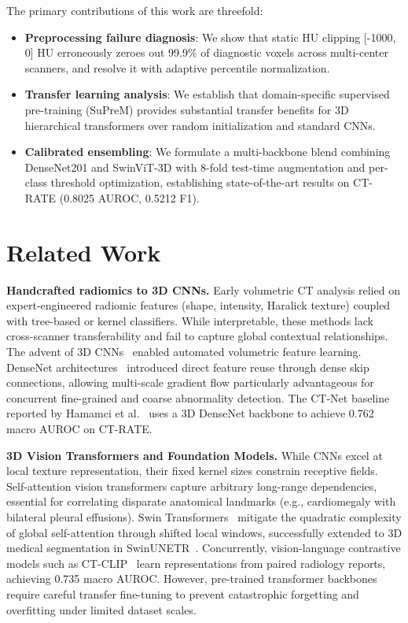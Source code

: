 \documentclass[runningheads]{llncs}
\begin{document}
The primary contributions of this work are threefold:
\begin{itemize}
\setlength{\itemsep}{1pt}\setlength{\parskip}{0pt}
\item \textbf{Preprocessing failure diagnosis}: We show that static HU clipping [-1000, 0] HU erroneously zeroes out 99.9\% of diagnostic voxels across multi-center scanners, and resolve it with adaptive percentile normalization.
\item \textbf{Transfer learning analysis}: We establish that domain-specific supervised pre-training (SuPreM) provides substantial transfer benefits for 3D hierarchical transformers over random initialization and standard CNNs.
\item \textbf{Calibrated ensembling}: We formulate a multi-backbone blend combining DenseNet201 and SwinViT-3D with 8-fold test-time augmentation and per-class threshold optimization, establishing state-of-the-art results on CT-RATE (0.8025 AUROC, 0.5212 F1).
\end{itemize}

\section{Related Work}
\noindent\textbf{Handcrafted radiomics to 3D CNNs.} Early volumetric CT analysis relied on expert-engineered radiomic features (shape, intensity, Haralick texture) coupled with tree-based or kernel classifiers. While interpretable, these methods lack cross-scanner transferability and fail to capture global contextual relationships. The advent of 3D CNNs~\cite{hara2018,monai2020} enabled automated volumetric feature learning. DenseNet architectures~\cite{huang2017} introduced direct feature reuse through dense skip connections, allowing multi-scale gradient flow particularly advantageous for concurrent fine-grained and coarse abnormality detection. The CT-Net baseline reported by Hamamci et al.~\cite{ctrate2024} uses a 3D DenseNet backbone to achieve 0.762 macro AUROC on CT-RATE.

\noindent\textbf{3D Vision Transformers and Foundation Models.} While CNNs excel at local texture representation, their fixed kernel sizes constrain receptive fields. Self-attention vision transformers capture arbitrary long-range dependencies, essential for correlating disparate anatomical landmarks (e.g., cardiomegaly with bilateral pleural effusions). Swin Transformers~\cite{liu2021} mitigate the quadratic complexity of global self-attention through shifted local windows, successfully extended to 3D medical segmentation in SwinUNETR~\cite{tang2022}. Concurrently, vision-language contrastive models such as CT-CLIP~\cite{ctrate2024} learn representations from paired radiology reports, achieving 0.735 macro AUROC. However, pre-trained transformer backbones require careful transfer fine-tuning to prevent catastrophic forgetting and overfitting under limited dataset scales.
\end{document}
